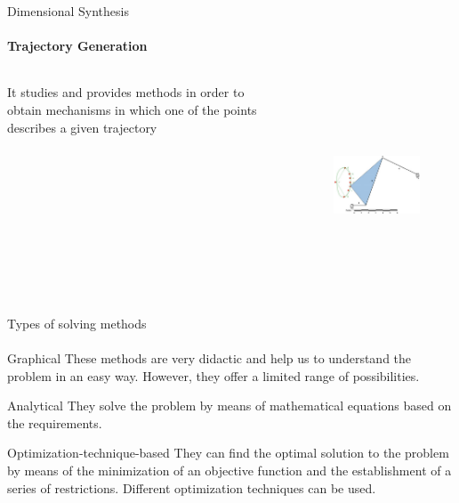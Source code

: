 \documentclass[aspectratio=169]{beamer}
\begin{document}
\begin{frame}[t]{Dimensional Synthesis}
\framesubtitle{Trajectory Generation}
    \begin{columns}[T,onlytextwidth]
        \begin{column}{0.49\textwidth}
            It studies and provides methods in order to obtain mechanisms in which one of the points describes a given trajectory
        \end{column}
        \begin{column}{0.49\textwidth}
            \vspace{-1cm}
            \begin{figure}[H]
                \centering\includegraphics[height=6cm,width=1\textwidth,keepaspectratio]{traj_gen1.png}
                \label{fig:traj_gen1.png}
            \end{figure}
        \end{column}
    \end{columns}
\end{frame}

\begin{frame}[t]{Types of solving methods}
\framesubtitle{}
    \begin{exampleblock}{Graphical}
        These methods are very didactic and help us to understand the problem in an easy way. However, they offer a limited range of possibilities.
    \end{exampleblock}
    
    \begin{exampleblock}{Analytical}
        They solve the problem by means of mathematical equations based on the requirements.
    \end{exampleblock}
    
    \begin{exampleblock}{Optimization-technique-based}
        They can ﬁnd the optimal solution to the problem by means of the minimization of an objective function and the establishment of a series of restrictions. Different optimization techniques can be used.
    \end{exampleblock}

\end{frame}
\end{document}
